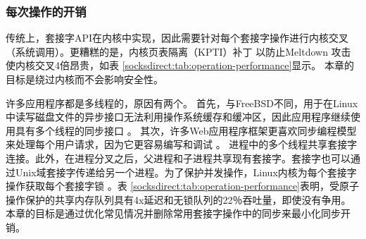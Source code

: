 \subsubsection{每次操作的开销}
\label{socksdirect:subsec:per-operation-overhead}

传统上，套接字API在内核中实现，因此需要针对每个套接字操作进行内核交叉（系统调用）。更糟糕的是，内核页表隔离（KPTI）补丁 \cite {kpti}以防止Meltdown \cite {Lipp2018meltdown}攻击使内核交叉4倍昂贵，如表 \ref {socksdirect:tab:operation-performance}显示。
本章的目标是绕过内核而不会影响安全性。

许多应用程序都是多线程的，原因有两个。
首先，与FreeBSD不同，用于在Linux中读写磁盘文件的异步接口无法利用操作系统缓存和缓冲区，因此应用程序继续使用具有多个线程的同步接口 \cite {nginx-multi-thread}。
其次，许多Web应用程序框架更喜欢同步编程模型来处理每个用户请求，因为它更容易编写和调试 \cite {barroso2017attack}。
进程中的多个线程共享套接字连接。此外，在进程分叉之后，父进程和子进程共享现有套接字。套接字也可以通过Unix域套接字传递给另一个进程。为了保护并发操作，Linux内核为每个套接字操作获取每个套接字锁 \cite {boyd2010analysis,han2012megapipe,lin2016scalable}。表 \ref {socksdirect:tab:operation-performance}表明，受原子操作保护的共享内存队列具有4x延迟和无锁队列的22％吞吐量，即使没有争用。
本章的目标是通过优化常见情况并删除常用套接字操作中的同步来最小化同步开销。






